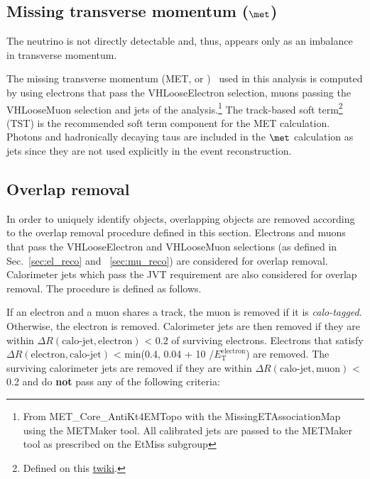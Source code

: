 \subsection{Missing transverse momentum ($\met$)}
\label{sec:met_def}

The neutrino is not directly detectable and, thus, appears only as an imbalance in
transverse momentum.
	
The missing transverse momentum (MET, or \met)~\cite{ATL-PHYS-PUB-2015-027} used in this analysis is computed by using electrons that pass the VHLooseElectron selection, muons passing the VHLooseMuon selection and jets of the analysis.\footnote{From MET\_Core\_AntiKt4EMTopo with the MissingETAssociationMap using the METMaker tool. All calibrated jets are passed to the METMaker tool as prescribed on the EtMiss subgroup } The track-based soft term\footnote{Defined on this \href{https://twiki.cern.ch/twiki/bin/view/AtlasProtected/EtmissSubgroupTrackSoftTermDescription}{twiki}.} (TST) is the recommended soft term component for the MET calculation. Photons and hadronically decaying taus are included in the $\met$ calculation as jets since they are not used explicitly in the event reconstruction.

\subsection{Overlap removal}
\label{sec:overlapremoval}
In order to uniquely identify objects, overlapping objects are removed according to the overlap removal procedure defined in this section. 
Electrons and muons that pass the VHLooseElectron and VHLooseMuon selections (as defined in Sec.~\ref{sec:el_reco} and ~\ref{sec:mu_reco}) are considered for overlap removal. 
Calorimeter jets which pass the JVT requirement are also considered for overlap removal. The procedure is defined as follows.

If an electron and a muon shares a track, the muon is removed if it is \textit{calo-tagged}. Otherwise, the electron is removed.
Calorimeter jets are then removed if they are within $\Delta R(\text{calo-jet}, \text{electron})$ < 0.2 of surviving electrons. 
Electrons that satisfy $\Delta R(\text{electron},\text{calo-jet})$ < min(0.4, 0.04 + 10 \GeV /$E^\text{electron}_\text{T}$) are removed. 
The surviving calorimeter jets are removed if they are within $\Delta R(\text{calo-jet}, \text{muon})$ < 0.2 and 
do \textbf{not} pass any of the following criteria:

